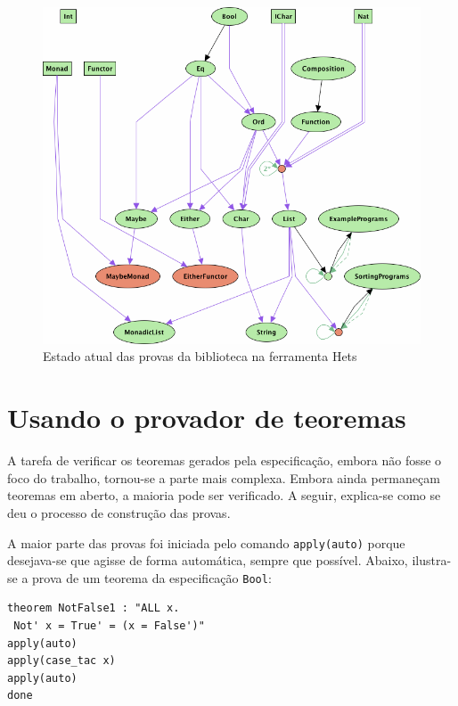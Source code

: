 \begin{figure}[hp]
	\centering
		\includegraphics[scale=0.6]{figuras/ProofEnd.png}
	\caption{Estado atual das provas da biblioteca na ferramenta Hets}
	\label{fig:ProofEnd}
\end{figure}

\section{Usando o provador de teoremas \Isabelle}
A tarefa de verificar os teoremas gerados pela especificação, embora não fosse o foco do trabalho, tornou-se a parte mais complexa. Embora ainda permaneçam teoremas em aberto, a maioria pode ser verificado. A seguir, explica-se como se deu o processo de construção das provas.

A maior parte das provas foi iniciada pelo comando \Verb.apply(auto). porque desejava-se que \Isabelle agisse de forma automática, sempre que possível. Abaixo, ilustra-se a prova de um teorema da especificação \Verb.Bool.:

\begin{Verbatim}
theorem NotFalse1 : "ALL x.
 Not' x = True' = (x = False')"
apply(auto)
apply(case_tac x)
apply(auto)
done
\end{Verbatim}

